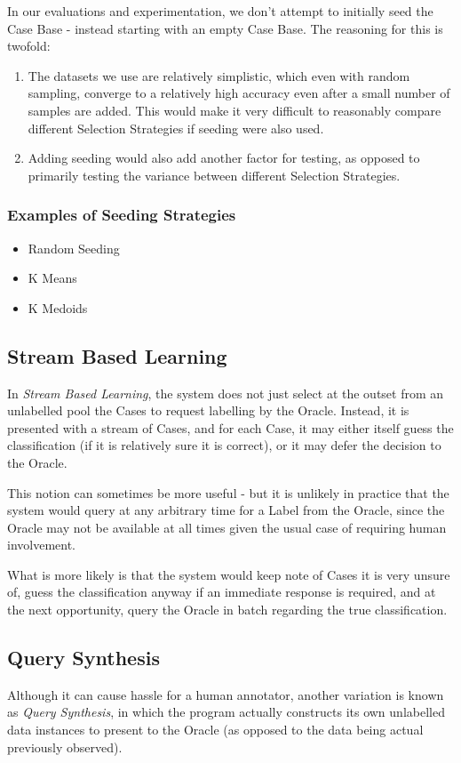 \documentclass[a4paper,11pt]{report}
\begin{document}
In our evaluations and experimentation, we don't attempt to initially seed the Case Base - instead starting with an empty Case Base. The reasoning for this is twofold: 
\begin{enumerate}
	\item The datasets we use are relatively simplistic, which even with random sampling, converge to a relatively high accuracy even after a small number of samples are added. This would make it very difficult to reasonably compare different Selection Strategies if seeding were also used. 
	\item Adding seeding would also add another factor for testing, as opposed to primarily testing the variance between different Selection Strategies.
\end{enumerate}

\subsubsection{Examples of Seeding Strategies}
\begin{itemize}
	\item Random Seeding
	\item K Means
	\item K Medoids
\end{itemize}

\subsection{Stream Based Learning}
In \emph{Stream Based Learning}, the system does not just select at the outset from an unlabelled pool the Cases to request labelling by the Oracle. Instead, it is presented with a stream of Cases, and for each Case, it may either itself guess the classification (if it is relatively sure it is correct), or it may defer the decision to the Oracle.

This notion can sometimes be more useful - but it is unlikely in practice that the system would query at any arbitrary time for a Label from the Oracle, since the Oracle may not be available at all times given the usual case of requiring human involvement.

What is more likely is that the system would keep note of Cases it is very unsure of, guess the classification anyway if an immediate response is required, and at the next opportunity, query the Oracle in batch regarding the true classification.

\subsection{Query Synthesis}
Although it can cause hassle for a human annotator, another variation is known as \emph{Query Synthesis}, in which the program actually constructs its own unlabelled data instances to present to the Oracle (as opposed to the data being actual previously observed).
\end{document}
